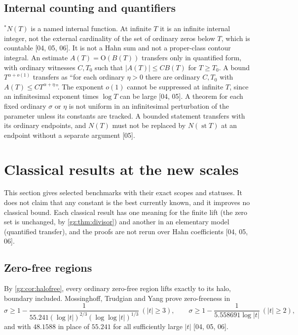 \documentclass[11pt,a4paper]{article}
\numberwithin{equation}{section}
\theoremstyle{definition}
\theoremstyle{remark}
\newcommand{\st}{\operatorname{st}}
\newcommand{\src}[1]{\textup{[#1]}}
\newcommand{\bigO}{\mathrm{O}}
\begin{document}
\subsection{Internal counting and quantifiers}\label{gz:sec:quantifiers}
${}^*N(T)$ is a named internal function. At infinite $T$ it is an infinite
internal integer, not the external cardinality of the set of ordinary zeros
below $T$, which is countable \src{04, 05, 06}. It is not a Hahn sum and not
a proper-class contour integral. An estimate $A(T)=\bigO(B(T))$ transfers
only in quantified form, with ordinary witnesses $C,T_0$ such that
$|A(T)|\le CB(T)$ for $T\ge T_0$. A bound $T^{\alpha+o(1)}$ transfers as ``for
each ordinary $\eta>0$ there are ordinary $C,T_0$ with
$A(T)\le CT^{\alpha+\eta}$''. The exponent $o(1)$ cannot be suppressed at
infinite $T$, since an infinitesimal exponent times $\log T$ can be large
\src{04, 05}. A theorem for each fixed ordinary $\sigma$ or $\eta$ is not
uniform in an infinitesimal perturbation of the parameter unless its
constants are tracked. A bounded statement transfers with its ordinary
endpoints, and $N(T)$ must not be replaced by $N(\st T)$ at an endpoint
without a separate argument \src{05}.

\section{Classical results at the new scales}\label{gz:sec:partial}

This section gives selected benchmarks with their exact scopes and statuses.
It does not claim that any constant is the best currently known, and it
improves no classical bound. Each classical result has one meaning for the
finite lift (the zero set is unchanged, by \cref{gz:thm:divisor}) and another
in an elementary model (quantified transfer), and the proofs are not rerun
over Hahn coefficients \src{04, 05, 06}.

\subsection{Zero-free regions}
By \cref{gz:cor:halofree}, every ordinary zero-free region lifts exactly to its
halo, boundary included. Mossinghoff, Trudgian and Yang prove zero-freeness
in
\[
\sigma\ge1-\frac1{55.241(\log|t|)^{2/3}(\log\log|t|)^{1/3}}\ (|t|\ge3),\qquad
\sigma\ge1-\frac1{5.558691\log|t|}\ (|t|\ge2),
\]
and with $48.1588$ in place of $55.241$ for all sufficiently large $|t|$
\cite{MTY} \src{04, 05, 06}.
\end{document}
